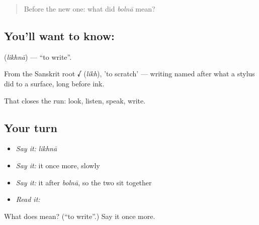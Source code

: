 \label{lesson:HI-C43-write}



\begin{quote}
Before the new one: what did \emph{bolnā} mean?
\end{quote}

\subsection*{You'll want to know: }
\textbf{} (\emph{likhnā}) — \textquotedblleft{}to write\textquotedblright{}.

From the Sanskrit root \textbf{√} (\emph{likh}), 'to scratch' — writing named after what a stylus did to a surface, long before ink.

\begin{grammarlens}[title={What you've built}]
That closes the run: look, listen, speak, write.
\end{grammarlens}

\subsection*{Your turn}
\begin{itemize}
\raggedright
  \item \emph{Say it:} \emph{likhnā}
  \item \emph{Say it:} it once more, slowly
  \item \emph{Say it:} it after \emph{bolnā}, so the two sit together
  \item \emph{Read it:} \textbf{}
\end{itemize}

\begin{tcolorbox}[breakable,colback=teal!4,colframe=teal!35!black,title={Before you move on}]
What does  mean? (\textquotedblleft{}to write\textquotedblright{}.) Say it once more.
\end{tcolorbox}
